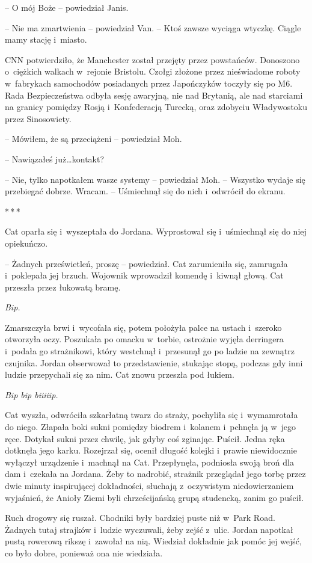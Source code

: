 \documentclass[oneside,polish,11pt,sfheadings]{mwbk}
\newcommand{\threeast}{\bigskip\par\centerline{*\,*\,*}\medskip\par}%
\begin{document}
-- O mój Boże -- powiedział Janis.

-- Nie ma zmartwienia -- powiedział Van. -- Ktoś zawsze wyciąga wtyczkę.
Ciągle mamy stację i~miasto.

CNN potwierdziło, że Manchester został przejęty przez powstańców.
Donoszono o~ciężkich walkach w~rejonie Bristolu. Czołgi złożone przez
nieświadome roboty w~fabrykach samochodów posiadanych przez Japończyków
toczyły się po M6. Rada Bezpieczeństwa odbyła sesję awaryjną, nie nad
Brytanią, ale nad starciami na granicy pomiędzy Rosją i~Konfederacją
Turecką, oraz zdobyciu Władywostoku przez Sinosowiety.

-- Mówiłem, że są przeciążeni -- powiedział Moh.

-- Nawiązałeś już\ldots kontakt?

-- Nie, tylko napotkałem wasze systemy -- powiedział Moh. -- Wszystko
wydaje się przebiegać dobrze. Wracam. -- Uśmiechnął się do nich i~odwrócił do ekranu.
  \threeast 

Cat oparła się i~wyszeptała do Jordana. Wyprostował się i~uśmiechnął się
do niej opiekuńczo.

-- Żadnych prześwietleń, proszę -- powiedział. Cat zarumieniła się,
zamrugała i~poklepała jej brzuch. Wojownik wprowadził komendę i~kiwnął
głową. Cat przeszła przez łukowatą bramę.

\emph{Bip.}

Zmarszczyła brwi i~wycofała się, potem położyła palce na ustach i~szeroko otworzyła oczy. Poszukała po omacku w~torbie, ostrożnie wyjęła
derringera i~podała go strażnikowi, który westchnął i~przesunął go po
ladzie na zewnątrz czujnika. Jordan obserwował to przedstawienie,
stukając stopą, podczas gdy inni ludzie przepychali się za nim. Cat
znowu przeszła pod łukiem.

\emph{Bip bip biiiiip.}

Cat wyszła, odwróciła szkarłatną twarz do straży, pochyliła się i~wymamrotała do niego. Złapała boki sukni pomiędzy biodrem i~kolanem i~pchnęła ją w~jego ręce. Dotykał sukni przez chwilę, jak gdyby coś
zginając. Puścił. Jedna ręka dotknęła jego karku. Rozejrzał się, ocenił
długość kolejki i~prawie niewidocznie wyłączył urządzenie i~machnął na
Cat. Przepłynęła, podniosła swoją broń dla dam i~czekała na Jordana.
Żeby to nadrobić, strażnik przeglądał jego torbę przez dwie minuty
inspirującej dokładności, słuchają z~oczywistym niedowierzaniem
wyjaśnień, że Anioły Ziemi byli chrześcijańską grupą studencką, zanim go
puścił.

Ruch drogowy się ruszał. Chodniki były bardziej puste niż w~Park Road.
Żadnych tutaj strajków i~ludzie wyczuwali, żeby zejść z~ulic. Jordan
napotkał pustą rowerową rikszę i~zawołał na nią. Wiedział dokładnie jak
pomóc jej wejść, co było dobre, ponieważ ona nie wiedziała.
\end{document}
